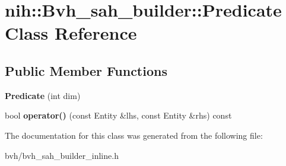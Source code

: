 \hypertarget{classnih_1_1_bvh__sah__builder_1_1_predicate}{
\section{nih\-:\-:\-Bvh\-\_\-sah\-\_\-builder\-:\-:\-Predicate \-Class \-Reference}
\label{classnih_1_1_bvh__sah__builder_1_1_predicate}
}
\subsection*{\-Public \-Member \-Functions}
\begin{DoxyCompactItemize}
\item 
\hypertarget{classnih_1_1_bvh__sah__builder_1_1_predicate_a67096095fdc5857247eac7490ef8dfa5}{
{\bfseries \-Predicate} (int dim)}
\label{classnih_1_1_bvh__sah__builder_1_1_predicate_a67096095fdc5857247eac7490ef8dfa5}

\item 
\hypertarget{classnih_1_1_bvh__sah__builder_1_1_predicate_aceb53e7cff77cab9ccf1782cf4d4eb01}{
bool {\bfseries operator()} (const \-Entity \&lhs, const \-Entity \&rhs) const }
\label{classnih_1_1_bvh__sah__builder_1_1_predicate_aceb53e7cff77cab9ccf1782cf4d4eb01}

\end{DoxyCompactItemize}


\-The documentation for this class was generated from the following file\-:\begin{DoxyCompactItemize}
\item 
bvh/bvh\-\_\-sah\-\_\-builder\-\_\-inline.\-h\end{DoxyCompactItemize}
